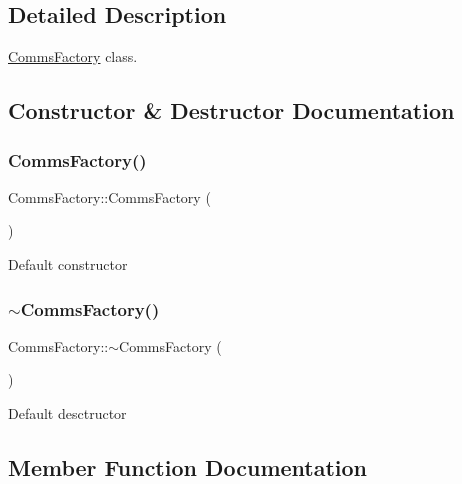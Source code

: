 \subsection{Detailed Description}
\hyperlink{classCommsFactory}{Comms\+Factory} class. 

\subsection{Constructor \& Destructor Documentation}
\mbox{\label{classCommsFactory_aa07ffd7bffb6002195c8a2c18fa344be}} 
\subsubsection{\texorpdfstring{Comms\+Factory()}{CommsFactory()}}
{\footnotesize\ttfamily Comms\+Factory\+::\+Comms\+Factory (\begin{DoxyParamCaption}{ }\end{DoxyParamCaption})\hspace{0.3cm}{\ttfamily [inline]}}

Default constructor \mbox{\label{classCommsFactory_ac5f4f8909ae9fd5d86ac41812227bdef}} 
\subsubsection{\texorpdfstring{$\sim$\+Comms\+Factory()}{~CommsFactory()}}
{\footnotesize\ttfamily Comms\+Factory\+::$\sim$\+Comms\+Factory (\begin{DoxyParamCaption}{ }\end{DoxyParamCaption})\hspace{0.3cm}{\ttfamily [inline]}}

Default desctructor 

\subsection{Member Function Documentation}
\mbox{\label{classCommsFactory_a424583e920e224310d47ea5e32f74ce3}} 
